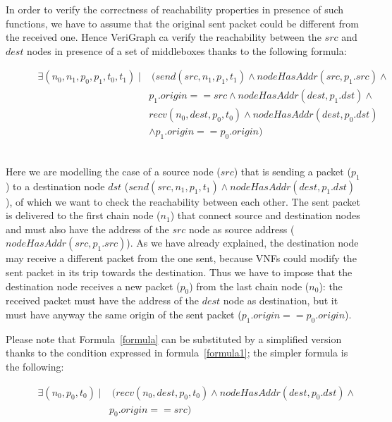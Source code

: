 In order to verify the correctness of reachability properties in presence of such functions, we have to assume that the original sent packet could be different from the received one. Hence VeriGraph ca verify the reachability between the \textit{$src$} and \textit{$dest$} nodes in presence of a set of middleboxes thanks to the following formula:
\begin{figure}[h]
	{\footnotesize
		\begin{equation}
				\begin{split}
				\exists (n_{0}, n_{1}, p_{0}, p_{1}, t_{0}, t_{1}) \; |&  \; (send(src, n_{1}, p_{1}, t_{1}) \wedge nodeHasAddr(src, p_{1}.src) \wedge \\
				& p_{1}.origin == src  \wedge nodeHasAddr(dest, p_{1}.dst) \wedge   \\
				&  recv(n_{0}, dest, p_{0}, t_{0}) \wedge nodeHasAddr(dest, p_{0}.dst) \\
				& \wedge p_{1}.origin == p_{0}.origin )
				\end{split}
			\label{formula}
		\end{equation}}
\end{figure}
\\
Here we are modelling the case of a source node (\textit{$src$}) that is sending a packet (\textit{$p_{1}$}) to a destination node \textit{$dst$} (\textit{$send(src, n_{1}, p_{1}, t_{1}) \wedge nodeHasAddr(dest, p_{1}.dst)$}), of which we want to check the reachability between each other. The sent packet is delivered to the first chain node (\textit{$n_{1}$}) that connect source and destination nodes and must also have the address of the \textit{$src$} node as source address (\textit{$nodeHasAddr(src, p_{1}.src)$}). As we have already explained, the destination node may receive a different packet from the one sent, because VNFs could modify the sent packet in its trip towards the destination. Thus we have to impose that the destination node receives a new packet (\textit{$p_{0}$}) from the last chain node (\textit{$n_{0}$}): the received packet  must have the address of the \textit{$dest$} node as destination, but it must have anyway the same origin of the sent packet (\textit{$p_{1}.origin == p_{0}.origin $}).

Please note that Formula~\ref{formula} can be substituted by a simplified version thanks to the condition expressed in formula~\ref{formula1}; the simpler formula is the following: 
\begin{figure}[h]
	{\footnotesize
		\begin{equation}
				\begin{split}
					\exists (n_{0}, p_{0}, t_{0}) \; |&  \; (recv(n_{0}, dest, p_{0}, t_{0}) \wedge nodeHasAddr(dest, p_{0}.dst) \wedge \\
					& p_{0}.origin == src )
				\end{split}
		\end{equation}}
\end{figure}
